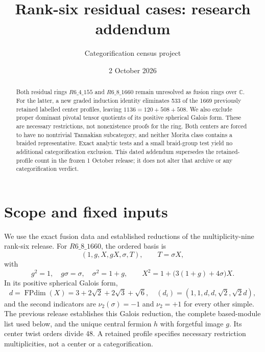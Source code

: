 \documentclass[10pt]{article}
\title{Rank-six residual cases: research addendum}
\author{Categorification census project}
\date{2 October 2026}
\newcommand{\FPdim}{\operatorname{FPdim}}
\begin{document}
\maketitle
\begin{abstract}
Both residual rings $R6\_4\_155$ and $R6\_8\_1660$ remain unresolved as fusion rings over $\mathbb C$. For the latter, a new graded induction identity eliminates 533 of the 1669 previously retained labelled center profiles, leaving $1136=120+508+508$. We also exclude proper dominant pivotal tensor quotients of its positive spherical Galois form. These are necessary restrictions, not nonexistence proofs for the ring. Both centers are forced to have no nontrivial Tannakian subcategory, and neither Morita class contains a braided representative. Exact analytic tests and a small braid-group test yield no additional categorification exclusion. This dated addendum supersedes the retained-profile count in the frozen 1 October release; it does not alter that archive or any categorification verdict.
\end{abstract}

\section{Scope and fixed inputs}
We use the exact fusion data and established reductions of the multiplicity-nine rank-six release. For $R6\_8\_1660$, the ordered basis is
\[
 (1,g,X,gX,\sigma,T),\qquad T=\sigma X,
\]
with
\[
 g^2=1,\quad g\sigma=\sigma,\quad \sigma^2=1+g,
 \qquad X^2=1+\bigl(3(1+g)+4\sigma\bigr)X.
\]
In its positive spherical Galois form,
\[
 d=\FPdim(X)=3+2\sqrt2+2\sqrt3+\sqrt6,
 \quad (d_i)=(1,1,d,d,\sqrt2,\sqrt2d),
\]
and the second indicators are $\nu_2(\sigma)=-1$ and $\nu_2=+1$ for every other simple. The previous release establishes this Galois reduction, the complete based-module list used below, and the unique central fermion $h$ with forgetful image $g$. Its center twist orders divide 48. A retained profile specifies necessary restriction multiplicities, not a center or a categorification.
\end{document}
